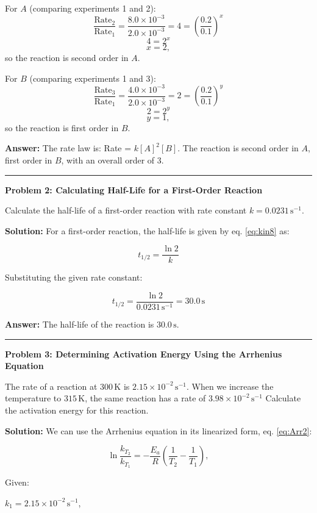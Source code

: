 \documentclass[
  9pt,
]{extbook}
\theoremstyle{definition}
\theoremstyle{definition}
\theoremstyle{definition}
\theoremstyle{definition}
\theoremstyle{remark}
\begin{document}
For \(A\) (comparing experiments 1 and 2):
\[\frac{\text{Rate}_2}{\text{Rate}_1} = \frac{8.0 \times 10^{-3}}{2.0 \times 10^{-3}} = 4 = \left(\frac{0.2}{0.1}\right)^x\]
\[4 = 2^x\]
\[x = 2,\]
so the reaction is second order in \(A\).

For \(B\) (comparing experiments 1 and 3):
\[\frac{\text{Rate}_3}{\text{Rate}_1} = \frac{4.0 \times 10^{-3}}{2.0 \times 10^{-3}} = 2 = \left(\frac{0.2}{0.1}\right)^y\]
\[2 = 2^y\]
\[y = 1,\]
so the reaction is first order in \(B\).

\textbf{Answer:} The rate law is: Rate = \(k[A]^2[B]\). The reaction is second order in \(A\), first order in \(B\), with an overall order of 3.

\begin{center}\rule{0.5\linewidth}{0.5pt}\end{center}

\textbf{Problem 2: Calculating Half-Life for a First-Order Reaction}

Calculate the half-life of a first-order reaction with rate constant \(k = 0.0231\,\text{s}^{-1}\).

\textbf{Solution:} For a first-order reaction, the half-life is given by eq. \eqref{eq:kin8} as:

\[t_{1/2} = \frac{\ln 2}{k}\]

Substituting the given rate constant:

\[t_{1/2} = \frac{\ln 2}{0.0231\,\text{s}^{-1}} = 30.0\,\text{s}\]

\textbf{Answer:} The half-life of the reaction is \(30.0\,\text{s}\).

\begin{center}\rule{0.5\linewidth}{0.5pt}\end{center}

\textbf{Problem 3: Determining Activation Energy Using the Arrhenius Equation}

The rate of a reaction at \(300\,\text{K}\) is
\(2.15 \times 10^{-2}\,\text{s}^{-1}\). When we increase the temperature to \(315\,\text{K}\), the same reaction has a rate of \(3.98 \times 10^{-2}\,\text{s}^{-1}\) Calculate the activation energy for this reaction.

\textbf{Solution:} We can use the Arrhenius equation in its linearized form, eq. \eqref{eq:Arr2}:

\[\ln \frac{k_{T_2}}{k_{T_1}}=-\frac{E_a}{R}\left(\frac{1}{T_2}-\frac{1}{T_1}\right),
\]

Given:

\(k_1 = 2.15 \times 10^{-2}\,\text{s}^{-1}\),
\end{document}
